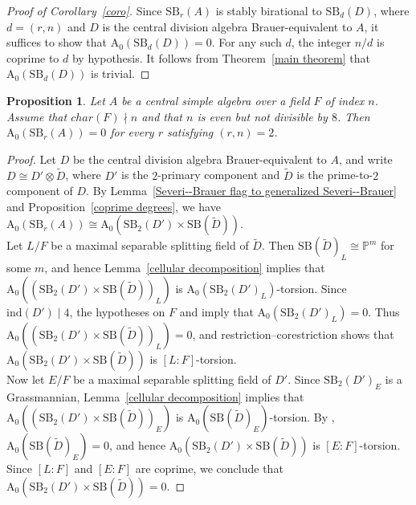 \documentclass[10pt]{amsart}
\theoremstyle{plain}
\newtheorem{proposition}[thm]{Proposition}
\theoremstyle{definition}
\begin{document}
\begin{proof}[Proof of Corollary~\ref{coro}]
Since \(\mathrm{SB}_r(A)\) is stably birational to \(\mathrm{SB}_d(D)\), where \(d=(r,n)\) and \(D\) is the central division algebra Brauer-equivalent to \(A\), it suffices to show that \(\mathrm{A_0}(\mathrm{SB}_d(D))=0\). For any such \(d\), the integer \(n/d\) is coprime to \(d\) by hypothesis. It follows from Theorem~\ref{main theorem} that \(\mathrm{A_0}(\mathrm{SB}_d(D))\) is trivial.
\end{proof}
\begin{proposition}\label{2-primary part is trivial}
Let \(A\) be a central simple algebra over a field \(F\) of index \(n\). Assume that \(char(F)\nmid n\) and that \(n\) is even but not divisible by \(8\). Then \(\mathrm{A_0}(\mathrm{SB}_r(A))=0\) for every \(r\) satisfying \((r,n)=2\).
\end{proposition}

\begin{proof}
Let \(D\) be the central division algebra Brauer-equivalent to \(A\), and write \(D \cong D' \otimes \tilde{D}\), where \(D'\) is the \(2\)-primary component and \(\tilde{D}\) is the prime-to-\(2\) component of \(D\). By Lemma~\ref{Severi--Brauer flag to generalized Severi--Brauer} and Proposition~\ref{coprime degrees}, we have
\(\mathrm{A_0}(\mathrm{SB}_r(A)) \cong \mathrm{A_0}(\mathrm{SB}_2(D') \times \mathrm{SB}(\tilde{D}))\).\\
Let \(L/F\) be a maximal separable splitting field of \(\tilde{D}\). Then \(\mathrm{SB}(\tilde{D})_L \cong \mathbb{P}^m\) for some \(m\), and hence Lemma~\ref{cellular decomposition} implies that \(\mathrm{A_0}((\mathrm{SB}_2(D') \times \mathrm{SB}(\tilde{D}))_L)\) is \(\mathrm{A_0}(\mathrm{SB}_2(D')_L)\)-torsion. Since \(\mathrm{ind}(D') \mid 4\), the hypotheses on \(F\) and \cite[Theorem~7.3]{zerocycle} imply that \(\mathrm{A_0}(\mathrm{SB}_2(D')_L)=0\). Thus \(\mathrm{A_0}((\mathrm{SB}_2(D') \times \mathrm{SB}(\tilde{D}))_L)=0\), and restriction--corestriction shows that \(\mathrm{A_0}(\mathrm{SB}_2(D') \times \mathrm{SB}(\tilde{D}))\) is \([L:F]\)-torsion.\\
Now let \(E/F\) be a maximal separable splitting field of \(D'\). Since \(\mathrm{SB}_2(D')_E\) is a Grassmannian, Lemma~\ref{cellular decomposition} implies that \(\mathrm{A_0}((\mathrm{SB}_2(D') \times \mathrm{SB}(\tilde{D}))_E)\) is \(\mathrm{A_0}(\mathrm{SB}(\tilde{D})_E)\)-torsion. By \cite[Corollary~7.3]{MC}, \(\mathrm{A_0}(\mathrm{SB}(\tilde{D})_E)=0\), and hence \(\mathrm{A_0}(\mathrm{SB}_2(D') \times \mathrm{SB}(\tilde{D}))\) is \([E:F]\)-torsion. Since \([L:F]\) and \([E:F]\) are coprime, we conclude that \(\mathrm{A_0}(\mathrm{SB}_2(D') \times \mathrm{SB}(\tilde{D}))=0\).
\end{proof}
\end{document}

